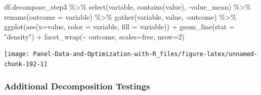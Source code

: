 \documentclass[
]{book}
\newenvironment{Shaded}{\begin{snugshade}}{\end{snugshade}}
\newcommand{\AttributeTok}[1]{\textcolor[rgb]{0.77,0.63,0.00}{#1}}
\newcommand{\DecValTok}[1]{\textcolor[rgb]{0.00,0.00,0.81}{#1}}
\newcommand{\FunctionTok}[1]{\textcolor[rgb]{0.00,0.00,0.00}{#1}}
\newcommand{\NormalTok}[1]{#1}
\newcommand{\SpecialCharTok}[1]{\textcolor[rgb]{0.00,0.00,0.00}{#1}}
\newcommand{\StringTok}[1]{\textcolor[rgb]{0.31,0.60,0.02}{#1}}
\begin{document}
\begin{Shaded}
\begin{Highlighting}[]
\NormalTok{df.decompose\_step3 }\SpecialCharTok{\%\textgreater{}\%}
    \FunctionTok{select}\NormalTok{(variable, }\FunctionTok{contains}\NormalTok{(}\StringTok{\textquotesingle{}value\textquotesingle{}}\NormalTok{), }\SpecialCharTok{{-}}\NormalTok{value\_mean) }\SpecialCharTok{\%\textgreater{}\%}
    \FunctionTok{rename}\NormalTok{(}\AttributeTok{outcome =}\NormalTok{ variable) }\SpecialCharTok{\%\textgreater{}\%}
    \FunctionTok{gather}\NormalTok{(variable, value, }\SpecialCharTok{{-}}\NormalTok{outcome) }\SpecialCharTok{\%\textgreater{}\%}
    \FunctionTok{ggplot}\NormalTok{(}\FunctionTok{aes}\NormalTok{(}\AttributeTok{x=}\NormalTok{value, }\AttributeTok{color =}\NormalTok{ variable, }\AttributeTok{fill =}\NormalTok{ variable)) }\SpecialCharTok{+}
        \FunctionTok{geom\_line}\NormalTok{(}\AttributeTok{stat =} \StringTok{"density"}\NormalTok{) }\SpecialCharTok{+}
        \FunctionTok{facet\_wrap}\NormalTok{(}\SpecialCharTok{\textasciitilde{}}\NormalTok{ outcome, }\AttributeTok{scales=}\StringTok{\textquotesingle{}free\textquotesingle{}}\NormalTok{, }\AttributeTok{nrow=}\DecValTok{2}\NormalTok{)}
\end{Highlighting}
\end{Shaded}

\begin{center}\texttt{[image: Panel-Data-and-Optimization-with-R\_files/figure-latex/unnamed-chunk-192-1]} \end{center}

\hypertarget{additional-decomposition-testings}{%
\subsubsection{Additional Decomposition Testings}\label{additional-decomposition-testings}}
\end{document}
